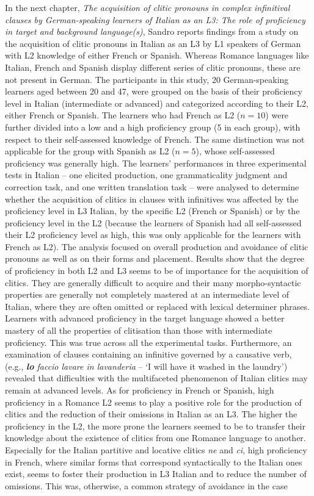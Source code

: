 \documentclass[output=paper,colorlinks,citecolor=brown,nonflat]{langsci/langscibook}
\begin{document}
In the next chapter, \textit{The acquisition of clitic pronouns in complex infinitival clauses by German-speaking learners of Italian as an L3: The role of proficiency in target and background language(s)}, Sandro \citeauthor{chapters/sciutti} reports findings from a study on the acquisition of clitic pronouns in Italian as an L3 by L1 speakers of German with L2 knowledge of either French or Spanish. Whereas Romance languages like Italian, French and Spanish display different series of clitic pronouns, these are not present in German. The participants in this study, 20 German-speaking learners aged between 20 and 47, were grouped on the basis of their proficiency level in Italian (intermediate or advanced) and categorized according to their L2, either French or Spanish. The learners who had French as L2 ($n=10$) were further divided into a low and a high proficiency group (5 in each group), with respect to their self-assessed knowledge of French. The same distinction was not applicable for the group with Spanish as L2 ($n=5$), whose self-assessed proficiency was generally high. The learners’ performances in three experimental tests in Italian – one elicited production, one grammaticality judgment and correction task, and one written translation task – were analysed to determine whether the acquisition of clitics in clauses with infinitives was affected by the proficiency level in L3 Italian, by the specific L2 (French or Spanish) or by the proficiency level in the L2 (because the learners of Spanish had all self-assessed their L2 proficiency level as high, this was only applicable for the learners with French as L2). The analysis focused on overall production and avoidance of clitic pronouns as well as on their forms and placement. Results show that the degree of proficiency in both L2 and L3 seems to be of importance for the acquisition of clitics. They are generally difficult to acquire and their many morpho-syntactic properties are generally not completely mastered at an intermediate level of Italian, where they are often omitted or replaced with lexical determiner phrases. Learners with advanced proficiency in the target language showed a better mastery of all the properties of clitisation than those with intermediate proficiency. This was true across all the experimental tasks. Furthermore, an examination of clauses containing an infinitive governed by a causative verb, (e.g., \textit{\textbf{lo} faccio lavare in lavanderia} – ‘I will have it washed in the laundry’) revealed that difficulties with the multifaceted phenomenon of Italian clitics may remain at advanced levels. As for proficiency in French or Spanish, high proficiency in a Romance L2 seems to play a positive role for the production of clitics and the reduction of their omissions in Italian as an L3. The higher the proficiency in the L2, the more prone the learners seemed to be to transfer their knowledge about the existence of clitics from one Romance language to another. Especially for the Italian partitive and locative clitics \textit{ne} and \textit{ci}, high proficiency in French, where similar forms that correspond syntactically to the Italian ones exist, seems to foster their production in L3 Italian and to reduce the number of omissions. This was, otherwise, a common strategy of avoidance in the case 
\end{document}
